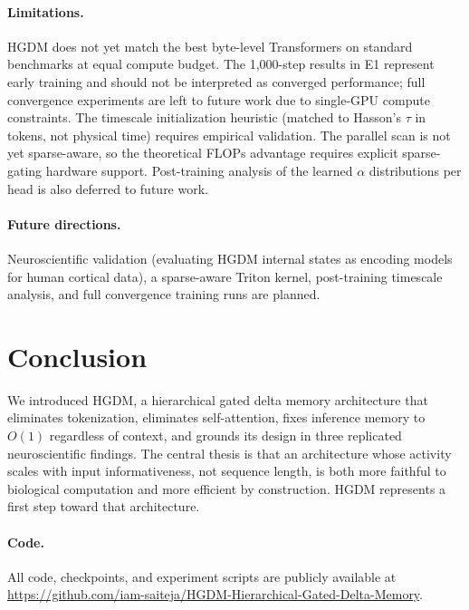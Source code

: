\documentclass{article}
\begin{document}
\paragraph{Limitations.}
HGDM does not yet match the best byte-level Transformers on standard benchmarks
at equal compute budget. The 1,000-step results in E1 represent early training and
should not be interpreted as converged performance; full convergence experiments
are left to future work due to single-GPU compute constraints.
The timescale initialization heuristic (matched to
Hasson's $\tau$ in tokens, not physical time) requires empirical validation.
The parallel scan is not yet sparse-aware, so the theoretical FLOPs advantage
requires explicit sparse-gating hardware support. Post-training analysis of the
learned $\alpha$ distributions per head is also deferred to future work.

\paragraph{Future directions.}
Neuroscientific validation (evaluating HGDM internal states as encoding models for human cortical data), a sparse-aware Triton kernel, post-training timescale analysis, and full convergence training runs are planned.

\section{Conclusion}
\label{sec:conclusion}

We introduced HGDM, a hierarchical gated delta memory architecture that
eliminates tokenization, eliminates self-attention, fixes inference memory to $O(1)$
regardless of context, and grounds its design in three replicated neuroscientific
findings. The central thesis is that an architecture whose activity scales with input informativeness, not sequence
length, is both more faithful to biological computation and more efficient by
construction. HGDM represents a first step toward that architecture.

\paragraph{Code.}
All code, checkpoints, and experiment scripts are publicly available at \url{https://github.com/iam-saiteja/HGDM-Hierarchical-Gated-Delta-Memory}.

\appendix
\end{document}

